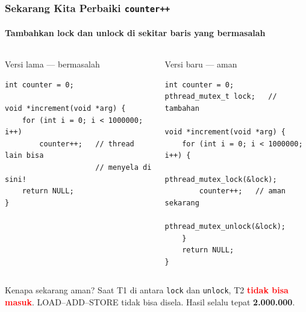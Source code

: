 \documentclass[t,aspectratio=169,xcolor=dvipsnames]{beamer}
\newcommand{\tem}[1]{\textbf{\textcolor{red}{#1}}}
\begin{document}
\begin{frame}[fragile,shrink=8]
    \frametitle{Sekarang Kita Perbaiki \texttt{counter++}}
    \framesubtitle{Tambahkan lock dan unlock di sekitar baris yang bermasalah}
    \footnotesize

    \begin{columns}[T]
        \begin{alertblock}{Versi lama — bermasalah}
\begin{lstlisting}[basicstyle=\ttfamily\scriptsize]
int counter = 0;

void *increment(void *arg) {
    for (int i = 0; i < 1000000; i++)
        counter++;   // thread lain bisa
                     // menyela di sini!
    return NULL;
}
\end{lstlisting}
        \end{alertblock}

        \begin{exampleblock}{Versi baru — aman}
\begin{lstlisting}[basicstyle=\ttfamily\scriptsize]
int counter = 0;
pthread_mutex_t lock;   // tambahan

void *increment(void *arg) {
    for (int i = 0; i < 1000000; i++) {
        pthread_mutex_lock(&lock);
        counter++;   // aman sekarang
        pthread_mutex_unlock(&lock);
    }
    return NULL;
}
\end{lstlisting}
        \end{exampleblock}
    \end{columns}

    \begin{block}{Kenapa sekarang aman?}
        Saat T1 di antara \texttt{lock} dan \texttt{unlock}, T2 \tem{tidak bisa masuk}.
        LOAD–ADD–STORE tidak bisa disela. Hasil selalu tepat \textbf{2.000.000}.
    \end{block}
\end{frame}
\end{document}
